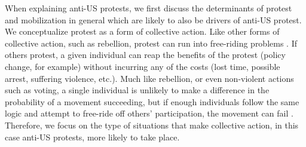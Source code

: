 


When explaining anti-US protests, we first discuss the determinants of protest and mobilization in general which are likely to also be drivers of anti-US protest.  We conceptualize protest as a form of collective action.  Like other forms of collective action, such as rebellion, protest can run into free-riding problems \cite{Olson1965,Lohmann1993}.  If others protest, a given individual can reap the benefits of the protest (policy change, for example) without incurring any of the costs (lost time, possible arrest, suffering violence, etc.).  Much like rebellion, or even non-violent actions such as voting, a single individual is unlikely to make a difference in the probability of a movement succeeding, but if enough individuals follow the same logic and attempt to free-ride off others' participation, the movement can fail \cite{lichbach1993}.  Therefore, we focus on the type of situations that make collective action, in this case anti-US protests, more likely to take place.  

